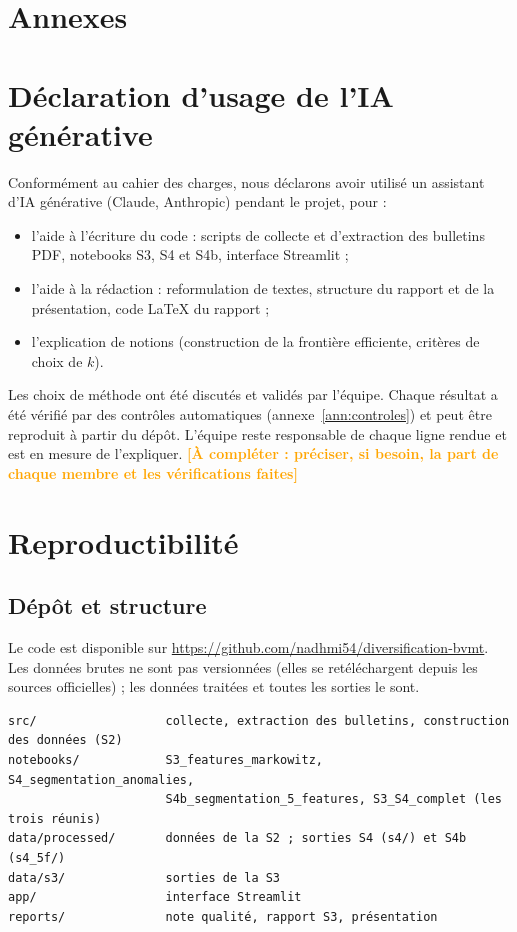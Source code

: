 \documentclass[11pt,a4paper]{article}
\newcommand{\afaire}[1]{\textcolor{orange}{\textbf{[À compléter : #1]}}}
\begin{document}
\clearpage
\appendix
\renewcommand{\thesection}{\Alph{section}}
\section*{Annexes}

\section{Déclaration d'usage de l'IA générative}\label{ann:ia}
Conformément au cahier des charges, nous déclarons avoir utilisé un assistant d'IA générative (Claude, Anthropic) pendant le projet, pour :
\begin{itemize}
  \item l'aide à l'écriture du code : scripts de collecte et d'extraction des bulletins PDF, notebooks S3, S4 et S4b, interface Streamlit ;
  \item l'aide à la rédaction : reformulation de textes, structure du rapport et de la présentation, code \LaTeX{} du rapport ;
  \item l'explication de notions (construction de la frontière efficiente, critères de choix de $k$).
\end{itemize}
Les choix de méthode ont été discutés et validés par l'équipe. Chaque résultat a été vérifié par des contrôles automatiques (annexe~\ref{ann:controles}) et peut être reproduit à partir du dépôt. L'équipe reste responsable de chaque ligne rendue et est en mesure de l'expliquer. \afaire{préciser, si besoin, la part de chaque membre et les vérifications faites}

\section{Reproductibilité}\label{ann:repro}
\subsection*{Dépôt et structure}
Le code est disponible sur \url{https://github.com/nadhmi54/diversification-bvmt}. Les données brutes ne sont pas versionnées (elles se retéléchargent depuis les sources officielles) ; les données traitées et toutes les sorties le sont.

\begin{verbatim}
src/                  collecte, extraction des bulletins, construction des données (S2)
notebooks/            S3_features_markowitz, S4_segmentation_anomalies,
                      S4b_segmentation_5_features, S3_S4_complet (les trois réunis)
data/processed/       données de la S2 ; sorties S4 (s4/) et S4b (s4_5f/)
data/s3/              sorties de la S3
app/                  interface Streamlit
reports/              note qualité, rapport S3, présentation
\end{verbatim}
\end{document}
